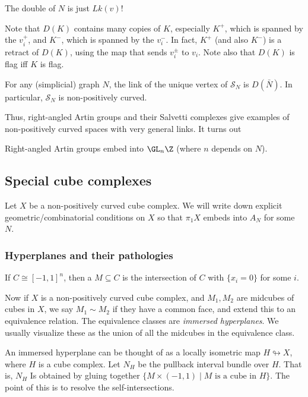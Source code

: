 \documentclass[a4paper]{article}
\begin{document}
\begin{eg}
  The double of $N$ is just $Lk(v)$!
\end{eg}

Note that $D(K)$ contains many copies of $K$, especially $K^+$, which is spanned by the $v_i^+$, and $K^-$, which is spanned by the $v_i^-$. In fact, $K^+$ (and also $K^-$) is a retract of $D(K)$, using the map that sends $v^{\pm}_i$ to $v_i$. Note also that $D(K)$ is flag iff $K$ is flag.

\begin{lemma}
  For any (simplicial) graph $N$, the link of the unique vertex of $\mathcal{S}_N$ is $D(\bar{N})$. In particular, $\mathcal{S}_N$ is non-positively curved.
\end{lemma}

Thus, right-angled Artin groups and their Salvetti complexes give examples of non-positively curved spaces with very general links. It turns out 

\begin{thm}
  Right-angled Artin groups embed into $\GL_n\Z$ (where $n$ depends on $N$).
\end{thm}

\subsection{Special cube complexes}
Let $X$ be a non-positively curved cube complex. We will write down explicit geometric/combinatorial conditions on $X$ so that $\pi_1 X$ embeds into $A_N$ for some $N$.

\subsubsection*{Hyperplanes and their pathologies}
If $C \cong [-1, 1]^n$, then a  $M \subseteq C$ is the intersection of $C$ with $\{x_i = 0\}$ for some $i$.


Now if $X$ is a non-positively curved cube complex, and $M_1, M_2$ are midcubes of cubes in $X$, we say $M_1 \sim M_2$ if they have a common face, and extend this to an equivalence relation. The equivalence classes are \emph{immersed hyperplanes}. We usually visualize these as the union of all the midcubes in the equivalence class.

An immersed hyperplane can be thought of as a locally isometric map $H \looparrowright X$, where $H$ is a cube complex. Let $N_H$ be the pullback interval bundle over $H$. That is, $N_H$ Is obtained by gluing together $\{M \times (-1, 1) \mid M\text{ is a cube in }H\}$. The point of this is to resolve the self-intersections.
\end{document}
